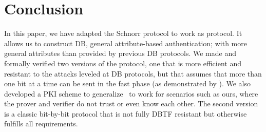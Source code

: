 \section{Conclusion}%
\label{Conclusion}

In this paper, we have adapted the Schnorr protocol to work as  
protocol.
It allows us to construct \ac{DB}, general attribute-based authentication; with 
more general attributes than provided by previous \ac{DB} protocols.
We made and formally verified two versions of the protocol, one that is more 
efficient and resistant to the attacks leveled at \ac{DB} protocols, but that 
assumes that more than one bit at a time can be sent in the fast phase (as 
demonstrated by \textcite{UWBPR}).
We also developed a \ac{PKI} scheme to generalize~\cite{UWBPR} to work for 
scenarios such as ours, where the prover and verifier do not trust or even know 
each other.
The second version is a classic bit-by-bit protocol that is not fully \ac{DBTF} 
resistant but otherwise fulfills all requirements.

